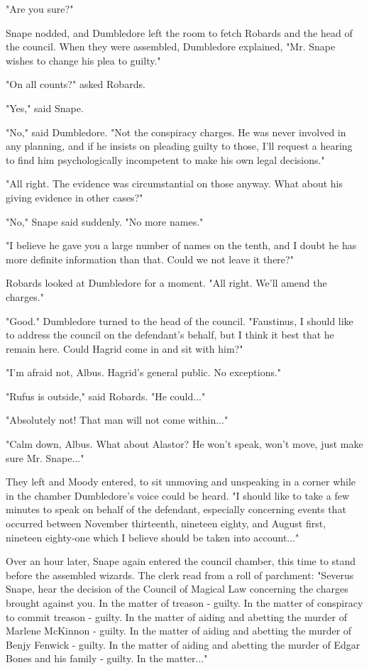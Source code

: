 \documentclass[a4paper,11pt]{article}
\begin{document}
"Are you sure?"

Snape nodded, and Dumbledore left the room to fetch Robards and the head of the council. When they were assembled, Dumbledore explained, "Mr. Snape wishes to change his plea to guilty."

"On all counts?" asked Robards.

"Yes," said Snape.

"No," said Dumbledore. "Not the conspiracy charges. He was never involved in any planning, and if he insists on pleading guilty to those, I'll request a hearing to find him psychologically incompetent to make his own legal decisions."

"All right. The evidence was circumstantial on those anyway. What about his giving evidence in other cases?"

"No," Snape said suddenly. "No more names."

"I believe he gave you a large number of names on the tenth, and I doubt he has more definite information than that. Could we not leave it there?"

Robards looked at Dumbledore for a moment. "All right. We'll amend the charges."

"Good." Dumbledore turned to the head of the council. "Faustinus, I should like to address the council on the defendant's behalf, but I think it best that he remain here. Could Hagrid come in and sit with him?"

"I'm afraid not, Albus. Hagrid's general public. No exceptions."

"Rufus is outside," said Robards. "He could..."

"Absolutely not! That man will not come within..."

"Calm down, Albus. What about Alastor? He won't speak, won't move, just make sure Mr. Snape..."

They left and Moody entered, to sit unmoving and unspeaking in a corner while in the chamber Dumbledore's voice could be heard. "I should like to take a few minutes to speak on behalf of the defendant, especially concerning events that occurred between November thirteenth, nineteen eighty, and August first, nineteen eighty-one which I believe should be taken into account..."

Over an hour later, Snape again entered the council chamber, this time to stand before the assembled wizards. The clerk read from a roll of parchment: "Severus Snape, hear the decision of the Council of Magical Law concerning the charges brought against you. In the matter of treason - guilty. In the matter of conspiracy to commit treason - guilty. In the matter of aiding and abetting the murder of Marlene McKinnon - guilty. In the matter of aiding and abetting the murder of Benjy Fenwick - guilty. In the matter of aiding and abetting the murder of Edgar Bones and his family - guilty. In the matter..."
\end{document}
